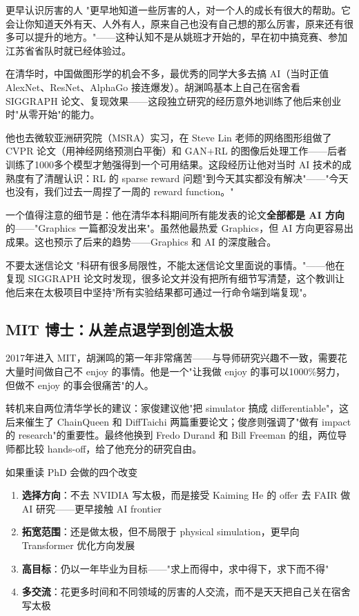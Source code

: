 \begin{importantbox}{更早认识厉害的人}
"更早地知道一些厉害的人，对一个人的成长有很大的帮助。它会让你知道天外有天、人外有人，原来自己也没有自己想的那么厉害，原来还有很多可以提升的地方。"——这种认知不是从姚班才开始的，早在初中搞竞赛、参加江苏省省队时就已经体验过。
\end{importantbox}

在清华时，中国做图形学的机会不多，最优秀的同学大多去搞 AI（当时正值 AlexNet、ResNet、AlphaGo 接连爆发）。胡渊鸣基本上自己在宿舍看 SIGGRAPH 论文、复现效果——这段独立研究的经历意外地训练了他后来创业时"从零开始"的能力。

他也去微软亚洲研究院（MSRA）实习，在 Steve Lin 老师的网络图形组做了 CVPR 论文（用神经网络预测白平衡）和 GAN+RL 的图像后处理工作——后者训练了1000多个模型才勉强得到一个可用结果。这段经历让他对当时 AI 技术的成熟度有了清醒认识：RL 的 sparse reward 问题"到今天其实都没有解决"——"今天也没有，我们过去一周捏了一周的 reward function。"

一个值得注意的细节是：他在清华本科期间所有能发表的论文\textbf{全部都是 AI 方向}的——"Graphics 一篇都没发出来"。虽然他最热爱 Graphics，但 AI 方向更容易出成果。这也预示了后来的趋势——Graphics 和 AI 的深度融合。

\begin{warningbox}{不要太迷信论文}
"科研有很多局限性，不能太迷信论文里面说的事情。"——他在复现 SIGGRAPH 论文时发现，很多论文并没有把所有细节写清楚，这个教训让他后来在太极项目中坚持"所有实验结果都可通过一行命令端到端复现"。
\end{warningbox}

\subsection{MIT 博士：从差点退学到创造太极}

2017年进入 MIT，胡渊鸣的第一年非常痛苦——与导师研究兴趣不一致，需要花大量时间做自己不 enjoy 的事情。他是一个"让我做 enjoy 的事可以1000\%努力，但做不 enjoy 的事会很痛苦"的人。

转机来自两位清华学长的建议：家俊建议他"把 simulator 搞成 differentiable"，这后来催生了 ChainQueen 和 DiffTaichi 两篇重要论文；俊彦则强调了"做有 impact 的 research"的重要性。最终他换到 Fredo Durand 和 Bill Freeman 的组，两位导师都比较 hands-off，给了他充分的研究自由。

\begin{importantbox}{如果重读 PhD 会做的四个改变}
\begin{enumerate}
\item \textbf{选择方向}：不去 NVIDIA 写太极，而是接受 Kaiming He 的 offer 去 FAIR 做 AI 研究——更早接触 AI frontier
\item \textbf{拓宽范围}：还是做太极，但不局限于 physical simulation，更早向 Transformer 优化方向发展
\item \textbf{高目标}：仍以一年毕业为目标——"求上而得中，求中得下，求下而不得"
\item \textbf{多交流}：花更多时间和不同领域的厉害的人交流，而不是天天把自己关在宿舍写太极
\end{enumerate}
\end{importantbox}


